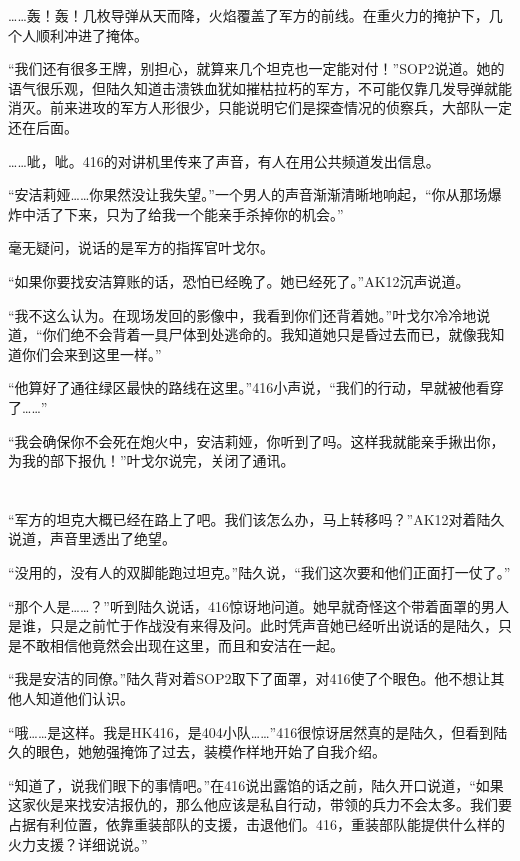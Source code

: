 ……轰！轰！几枚导弹从天而降，火焰覆盖了军方的前线。在重火力的掩护下，几个人顺利冲进了掩体。

“我们还有很多王牌，别担心，就算来几个坦克也一定能对付！”SOP2说道。她的语气很乐观，但陆久知道击溃铁血犹如摧枯拉朽的军方，不可能仅靠几发导弹就能消灭。前来进攻的军方人形很少，只能说明它们是探查情况的侦察兵，大部队一定还在后面。

……呲，呲。416的对讲机里传来了声音，有人在用公共频道发出信息。

“安洁莉娅……你果然没让我失望。”一个男人的声音渐渐清晰地响起，“你从那场爆炸中活了下来，只为了给我一个能亲手杀掉你的机会。”

毫无疑问，说话的是军方的指挥官叶戈尔。

“如果你要找安洁算账的话，恐怕已经晚了。她已经死了。”AK12沉声说道。

“我不这么认为。在现场发回的影像中，我看到你们还背着她。”叶戈尔冷冷地说道，“你们绝不会背着一具尸体到处逃命的。我知道她只是昏过去而已，就像我知道你们会来到这里一样。”

“他算好了通往绿区最快的路线在这里。”416小声说，“我们的行动，早就被他看穿了……”

“我会确保你不会死在炮火中，安洁莉娅，你听到了吗。这样我就能亲手揪出你，为我的部下报仇！”叶戈尔说完，关闭了通讯。

\section*{}

“军方的坦克大概已经在路上了吧。我们该怎么办，马上转移吗？”AK12对着陆久说道，声音里透出了绝望。

“没用的，没有人的双脚能跑过坦克。”陆久说，“我们这次要和他们正面打一仗了。”

“那个人是……？”听到陆久说话，416惊讶地问道。她早就奇怪这个带着面罩的男人是谁，只是之前忙于作战没有来得及问。此时凭声音她已经听出说话的是陆久，只是不敢相信他竟然会出现在这里，而且和安洁在一起。

“我是安洁的同僚。”陆久背对着SOP2取下了面罩，对416使了个眼色。他不想让其他人知道他们认识。

“哦……是这样。我是HK416，是404小队……”416很惊讶居然真的是陆久，但看到陆久的眼色，她勉强掩饰了过去，装模作样地开始了自我介绍。

“知道了，说我们眼下的事情吧。”在416说出露馅的话之前，陆久开口说道，“如果这家伙是来找安洁报仇的，那么他应该是私自行动，带领的兵力不会太多。我们要占据有利位置，依靠重装部队的支援，击退他们。416，重装部队能提供什么样的火力支援？详细说说。”

